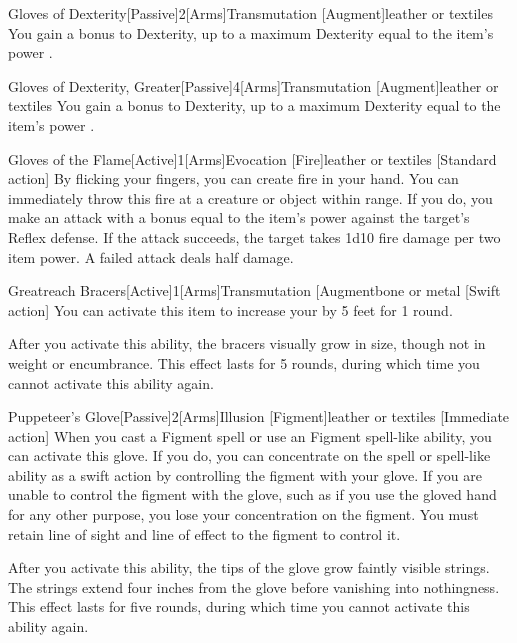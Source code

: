 \begin{magicitemdef}{Gloves of Dexterity}[Passive]{2}[Arms]{Transmutation [Augment]}{leather or textiles}
     You gain a  bonus to Dexterity, up to a maximum Dexterity equal to the item's power .
\end{magicitemdef}

\begin{magicitemdef}{Gloves of Dexterity, Greater}[Passive]{4}[Arms]{Transmutation [Augment]}{leather or textiles}
     You gain a  bonus to Dexterity, up to a maximum Dexterity equal to the item's power .
\end{magicitemdef}

\begin{magicitemdef}{Gloves of the Flame}[Active]{1}[Arms]{Evocation [Fire]}{leather or textiles}
    [Standard action] By flicking your fingers, you can create fire in your hand.
    You can immediately throw this fire at a creature or object within \rngclose range.
    If you do, you make an attack with a bonus equal to the item's power against the target's Reflex defense.
    If the attack succeeds, the target takes 1d10 fire damage per two item power.
    A failed attack deals half damage.
\end{magicitemdef}

\begin{magicitemdef}{Greatreach Bracers}[Active]{1}[Arms]{Transmutation [Augment}{bone or metal}
    [Swift action] You can activate this item to increase your  by 5 feet for 1 round.

    After you activate this ability, the bracers visually grow in size, though not in weight or encumbrance.
    This effect lasts for 5 rounds, during which time you cannot activate this ability again.
\end{magicitemdef}

\begin{magicitemdef}{Puppeteer's Glove}[Passive]{2}[Arms]{Illusion [Figment]}{leather or textiles}
    [Immediate action] When you cast a Figment spell or use an Figment spell-like ability, you can activate this glove.
    If you do, you can concentrate on the spell or spell-like ability as a swift action by controlling the figment with your glove.
    If you are unable to control the figment with the glove, such as if you use the gloved hand for any other purpose, you lose your concentration on the figment.
    You must retain line of sight and line of effect to the figment to control it.

    After you activate this ability, the tips of the glove grow faintly visible strings.
    The strings extend four inches from the glove before vanishing into nothingness.
    This effect lasts for five rounds, during which time you cannot activate this ability again.
\end{magicitemdef}

